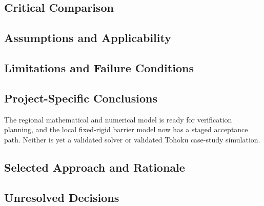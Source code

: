 
\subsection{Critical Comparison}
\label{sec:res-ver-spec-critical-comparison}


\subsection{Assumptions and Applicability}
\label{sec:res-ver-spec-assumptions}


\subsection{Limitations and Failure Conditions}
\label{sec:res-ver-spec-limitations}


\subsection{Project-Specific Conclusions}
\label{sec:res-ver-spec-conclusions}


The regional mathematical and numerical model is ready for verification
planning, and the local fixed-rigid barrier model now has a staged
acceptance path. Neither is yet a validated solver or validated Tohoku
case-study simulation.

\subsection{Selected Approach and Rationale}
\label{sec:res-ver-spec-selected-approach}


\subsection{Unresolved Decisions}
\label{sec:res-ver-spec-unresolved-decisions}

